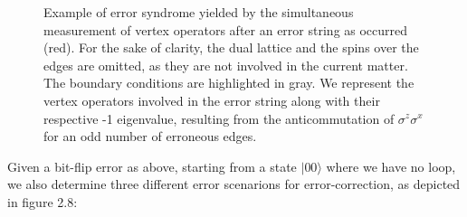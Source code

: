 \documentclass{Configuration_Files/PoliMi3i_thesis}
\begin{document}
\begin{figure}
\begin{center}
	\end{center}
	\caption{Example of error syndrome yielded by the simultaneous measurement of vertex operators after an error string as occurred (red). For the sake of clarity, the dual lattice and the spins over the edges are omitted, as they are not involved in the current matter. The boundary conditions are highlighted in gray. We represent the vertex operators involved in the error string along with their respective -1 eigenvalue, resulting from the anticommutation of $\sigma^z\sigma^x$ for an odd number of erroneous edges.}
	\label{fig:simmes}
\end{figure}



Given a bit-flip error as above, starting from a state $|00\rangle$ where we have no loop, we also determine three different error scenarions for error-correction, as depicted in figure 2.8: 
\end{document}
